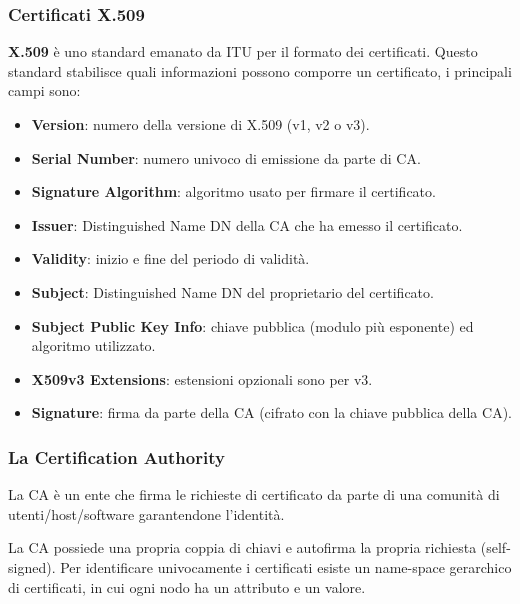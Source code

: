         \subsubsection{Certificati X.509}
            \textbf{X.509} è uno standard emanato da ITU per il formato dei certificati. Questo standard stabilisce quali informazioni possono comporre un certificato, i principali campi sono:
            \begin{itemize}
                \item \textbf{Version}: numero della versione di X.509 (v1, v2 o v3).
                \item \textbf{Serial Number}: numero univoco di emissione da parte di CA.
                \item \textbf{Signature Algorithm}: algoritmo usato per firmare il certificato.
                \item \textbf{Issuer}: Distinguished Name DN della CA che ha emesso il certificato.
                \item \textbf{Validity}: inizio e fine del periodo di validità.
                \item \textbf{Subject}: Distinguished Name DN del proprietario del certificato.
                \item \textbf{Subject Public Key Info}: chiave pubblica (modulo più esponente) ed algoritmo utilizzato.
                \item \textbf{X509v3 Extensions}: estensioni opzionali sono per v3.
                \item \textbf{Signature}: firma da parte della CA (cifrato con la chiave pubblica della
                CA).
            \end{itemize}

            
            
        \subsubsection{La Certification Authority}
            La CA è un ente che firma le richieste di certificato da parte di una comunità di utenti/host/software garantendone l'identità.
        
            La CA possiede una propria coppia di chiavi e autofirma la propria richiesta (self-signed). Per identificare univocamente i certificati esiste un name-space gerarchico di certificati, in cui ogni nodo ha un attributo e un valore.
        
